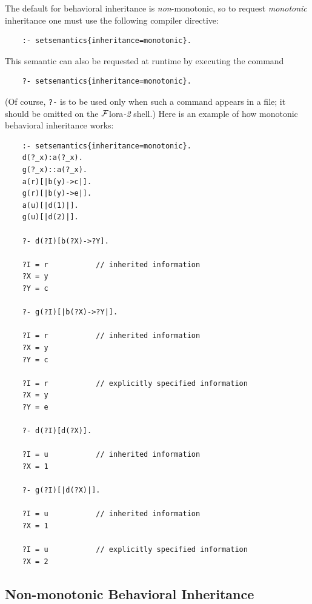 \documentclass[11pt]{article}
\newcommand{\FLORA}{{\mbox{\sc ${\cal F}${lora}\rm\emph{-2}}}\xspace}
\newcommand{\FLSYSTEM}{\FLORA}
\begin{document}
The default for behavioral inheritance is \emph{non}-monotonic, so to request
\emph{monotonic} inheritance one must use the following compiler directive:
\begin{verbatim}
    :- setsemantics{inheritance=monotonic}.
\end{verbatim}
This semantic can also be requested at runtime by executing the command
\begin{verbatim}
    ?- setsemantics{inheritance=monotonic}.
\end{verbatim}
(Of course, \texttt{?-} is to be used only when such a command appears in a
file; it should be omitted on the \FLSYSTEM shell.) 
Here is an example of how monotonic behavioral inheritance works:
\begin{verbatim}
    :- setsemantics{inheritance=monotonic}.
    d(?_x):a(?_x).
    g(?_x)::a(?_x).
    a(r)[|b(y)->c|].
    g(r)[|b(y)->e|].
    a(u)[|d(1)|].
    g(u)[|d(2)|].

    ?- d(?I)[b(?X)->?Y].

    ?I = r           // inherited information
    ?X = y
    ?Y = c

    ?- g(?I)[|b(?X)->?Y|].

    ?I = r           // inherited information
    ?X = y
    ?Y = c

    ?I = r           // explicitly specified information
    ?X = y
    ?Y = e

    ?- d(?I)[d(?X)].

    ?I = u           // inherited information
    ?X = 1

    ?- g(?I)[|d(?X)|].

    ?I = u           // inherited information
    ?X = 1

    ?I = u           // explicitly specified information
    ?X = 2
\end{verbatim}

\subsection{Non-monotonic Behavioral Inheritance}
\end{document}
